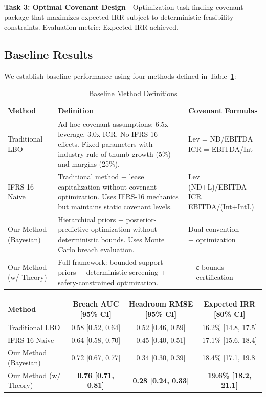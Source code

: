 \documentclass[11pt,a4paper]{article}
\begin{document}
\textbf{Task 3: Optimal Covenant Design} - Optimization task finding covenant package that maximizes expected IRR subject to deterministic feasibility constraints. Evaluation metric: Expected IRR achieved.

\subsection{Baseline Results}

We establish baseline performance using four methods defined in Table~\ref{tab:baseline_definitions}:

\begin{table}[h]
\centering
\caption{Baseline Method Definitions}
\label{tab:baseline_definitions}
\begin{tabular}{lp{8cm}p{3cm}}
\toprule
Method & Definition & Covenant Formulas \\
\midrule
Traditional LBO & Ad-hoc covenant assumptions: 6.5x leverage, 3.0x ICR. No IFRS-16 effects. Fixed parameters with industry rule-of-thumb growth (5\%) and margins (25\%). & \footnotesize{Lev = ND/EBITDA \\ ICR = EBITDA/Int} \\
IFRS-16 Naive & Traditional method + lease capitalization without covenant optimization. Uses IFRS-16 mechanics but maintains static covenant levels. & \footnotesize{Lev = (ND+L)/EBITDA \\ ICR = EBITDA/(Int+IntL)} \\
Our Method (Bayesian) & Hierarchical priors + posterior-predictive optimization without deterministic bounds. Uses Monte Carlo breach evaluation. & \footnotesize{Dual-convention \\ + optimization} \\
Our Method (w/ Theory) & Full framework: bounded-support priors + deterministic screening + safety-constrained optimization. & \footnotesize{+ ε-bounds \\ + certification} \\
\bottomrule
\end{tabular}
\end{table}

\begin{center}
\begin{tabular}{lccc}
\toprule
Method & Breach AUC [95\% CI] & Headroom RMSE [95\% CI] & Expected IRR [80\% CI] \\
\midrule
Traditional LBO & 0.58 [0.52, 0.64] & 0.52 [0.46, 0.59] & 16.2\% [14.8, 17.5] \\
IFRS-16 Naive & 0.64 [0.58, 0.70] & 0.45 [0.40, 0.51] & 17.1\% [15.6, 18.4] \\
Our Method (Bayesian) & 0.72 [0.67, 0.77] & 0.34 [0.30, 0.39] & 18.4\% [17.1, 19.8] \\
Our Method (w/ Theory) & \textbf{0.76 [0.71, 0.81]} & \textbf{0.28 [0.24, 0.33]} & \textbf{19.6\% [18.2, 21.1]} \\
\bottomrule
\end{tabular}
\end{center}
\end{document}
